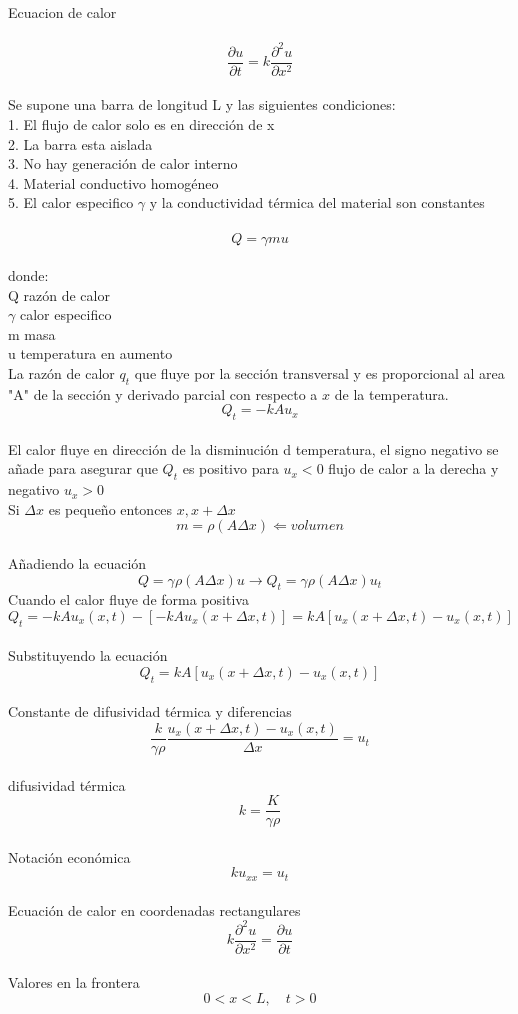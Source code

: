 \documentclass[10pt,a4paper]{report}
\begin{document}
\Large Ecuacion de calor
\\
\\ \large{$$\displaystyle \frac{\partial u}{\partial t} = k \frac{\partial ^2 u}{\partial x^2}$$}
\\ \Large Se supone una barra de longitud L y las siguientes condiciones:
\\ 1. El flujo de calor solo es en dirección de x
\\ 2. La barra esta aislada
\\ 3. No hay generación de calor interno
\\ 4. Material conductivo homogéneo
\\ 5. El calor especifico $\gamma$ y la conductividad térmica del material son constantes
\\
\\ $$Q= \gamma m u$$
\\ donde:
\\ Q razón de calor
\\ $\gamma$ calor especifico
\\ m masa
\\ u temperatura en aumento
\\ \Large La razón de calor $q_t$ que fluye por la sección transversal y es proporcional al area "A" de la sección y derivado parcial con respecto a $x$ de la temperatura.
\\$$\displaystyle Q_t = -kAu_x$$
\\ \Large El calor fluye en dirección de la disminución d temperatura, el signo negativo se añade para asegurar que $Q_t$ es positivo para $u_x<0$ flujo de calor a la derecha y negativo $u_x>0$
\\Si $\displaystyle \Delta x$ es pequeño entonces  $\displaystyle x, x + \Delta x$
\\$$\displaystyle m = \rho (A\Delta x)\Leftarrow volumen$$
\\Añadiendo la ecuación
\\$$\displaystyle Q = \gamma \rho (A \Delta x) u \rightarrow Q_t = \gamma \rho (A \Delta x) u_t $$
\newpage
Cuando el calor fluye de forma positiva
\\$$\displaystyle Q_t = -kAu_x (x,t) - [-kAu_x(x + \Delta x, t)]= kA[u_x(x + \Delta x, t)-u_x(x,t)]$$
\\Substituyendo la ecuación
\\ $$\displaystyle Q_t=kA[u_x(x + \Delta x, t)-u_x(x,t)]$$
\\Constante de difusividad térmica y diferencias
\\$$\displaystyle \dfrac{k}{\gamma \rho} \dfrac{u_x(x+ \Delta x,t)-u_x(x,t)}{\Delta x}= u_t$$
\\difusividad térmica
\\$$k = \dfrac{K}{\gamma \rho}$$ 
\\ Notación económica
\\$$\displaystyle ku_{xx}=u_t $$
\\ Ecuación de calor en coordenadas rectangulares
\\\Large $$\displaystyle k\frac{\partial ^2u}{\partial x^2} = \frac{\partial u}{\partial t}$$
\\ Valores en la frontera
\\$$\displaystyle 0<x<L, \quad t>0$$
\end{document}
